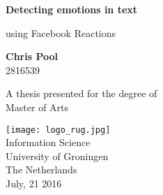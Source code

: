 \begin{titlepage}
    \begin{center}
        \vspace*{1cm}
        \Huge
        \textbf{Detecting emotions in text}
        
        \vspace{0.5cm}
        \LARGE
        using Facebook Reactions
        
        \vspace{1.5cm}
        
        \textbf{Chris Pool}\\
        \large 
        2816539
        
        \vfill
        \large
        A thesis presented for the degree of\\
        Master of Arts
        
        \vspace{0.8cm}
        
        \texttt{[image: logo\_rug.jpg]}\\
        \vspace{0.8cm}
        \large
        Information Science\\
        University of Groningen\\
        The Netherlands\\
        July, 21 2016
        
    \end{center}
\end{titlepage}